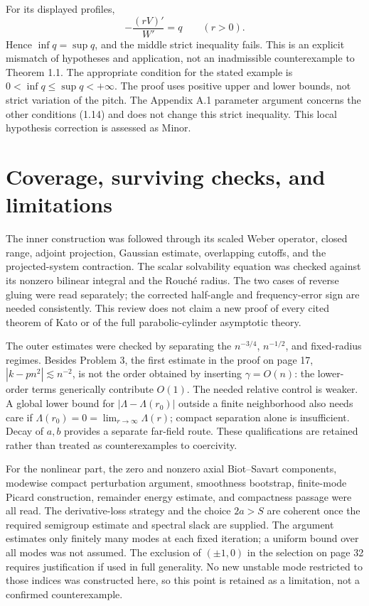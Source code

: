 \documentclass[10pt]{article}
\begin{document}
For its displayed profiles, \[-\frac{(rV)'}{W'}=q\qquad(r>0).\] Hence \(\inf q=\sup q\), and the middle strict inequality fails. This is an explicit mismatch of hypotheses and application, not an inadmissible counterexample to Theorem 1.1. The appropriate condition for the stated example is \(0<\inf q\le\sup q<+\infty\). The proof uses positive upper and lower bounds, not strict variation of the pitch. The Appendix A.1 parameter argument concerns the other conditions (1.14) and does not change this strict inequality. This local hypothesis correction is assessed as Minor.\par
\section*{Coverage, surviving checks, and limitations}
The inner construction was followed through its scaled Weber operator, closed range, adjoint projection, Gaussian estimate, overlapping cutoffs, and the projected-system contraction. The scalar solvability equation was checked against its nonzero bilinear integral and the Rouché radius. The two cases of reverse gluing were read separately; the corrected half-angle and frequency-error sign are needed consistently. This review does not claim a new proof of every cited theorem of Kato or of the full parabolic-cylinder asymptotic theory.\par
The outer estimates were checked by separating the \(n^{-3/4}\), \(n^{-1/2}\), and fixed-radius regimes. Besides Problem 3, the first estimate in the proof on page 17, \(|k-pn^2|\lesssim n^{-2}\), is not the order obtained by inserting \(\gamma=O(n)\): the lower-order terms generically contribute \(O(1)\). The needed relative control is weaker. A global lower bound for \(|\Lambda-\Lambda(r_0)|\) outside a finite neighborhood also needs care if \(\Lambda(r_0)=0=\lim_{r\to\infty}\Lambda(r)\); compact separation alone is insufficient. Decay of \(a,b\) provides a separate far-field route. These qualifications are retained rather than treated as counterexamples to coercivity.\par
For the nonlinear part, the zero and nonzero axial Biot–Savart components, modewise compact perturbation argument, smoothness bootstrap, finite-mode Picard construction, remainder energy estimate, and compactness passage were all read. The derivative-loss strategy and the choice \(2a>S\) are coherent once the required semigroup estimate and spectral slack are supplied. The argument estimates only finitely many modes at each fixed iteration; a uniform bound over all modes was not assumed. The exclusion of \((\pm1,0)\) in the selection on page 32 requires justification if used in full generality. No new unstable mode restricted to those indices was constructed here, so this point is retained as a limitation, not a confirmed counterexample.\par
\end{document}
